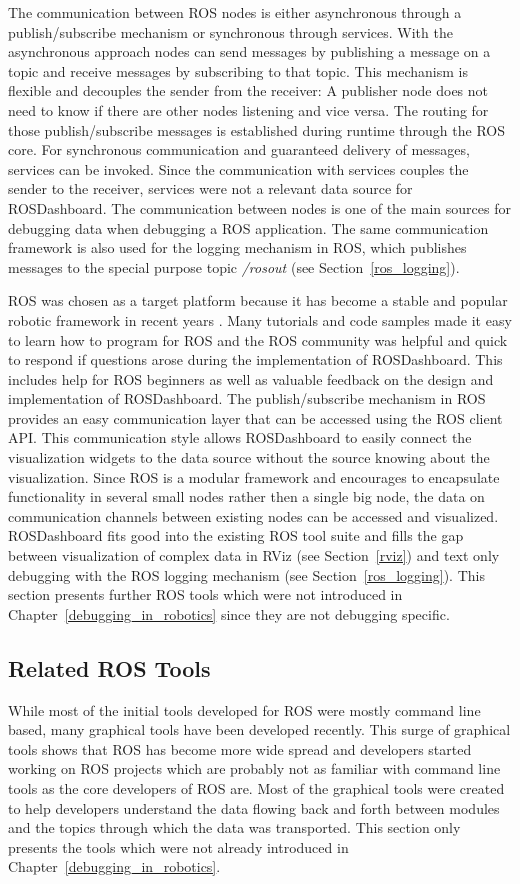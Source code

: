 The communication between ROS nodes is either asynchronous through a publish/subscribe mechanism or synchronous through services. With the asynchronous approach nodes can send messages by publishing a message on a topic and receive messages by subscribing to that topic. This mechanism is flexible and decouples the sender from the receiver: A publisher node does not need to know if there are other nodes listening and vice versa. The routing for those publish/subscribe messages is established during runtime through the ROS core. For synchronous communication and guaranteed delivery of messages, services can be invoked. Since the communication with services couples the sender to the receiver, services were not a relevant data source for ROSDashboard. The communication between nodes is one of the main sources for debugging data when debugging a ROS application. The same communication framework is also used for the logging mechanism in ROS, which publishes messages to the special purpose topic \emph{/rosout} (see Section~\ref{ros_logging}).

ROS was chosen as a target platform because it has become a stable and popular robotic framework in recent years \cite{Foote2012}. Many tutorials and code samples made it easy to learn how to program for ROS and the ROS community was helpful and quick to respond if questions arose during the implementation of ROSDashboard. This includes help for ROS beginners as well as valuable feedback on the design and implementation of ROSDashboard. The publish/subscribe mechanism in ROS provides an easy communication layer that can be accessed using the ROS client API. This communication style allows ROSDashboard to easily connect the visualization widgets to the data source without the source knowing about the visualization. Since ROS is a modular framework and encourages to encapsulate functionality in several small nodes rather then a single big node, the data on communication channels between existing nodes can be accessed and visualized. ROSDashboard fits good into the existing ROS tool suite and fills the gap between visualization of complex data in RViz (see Section~\ref{rviz}) and text only debugging with the ROS logging mechanism (see Section~\ref{ros_logging}). This section presents further ROS tools which were not introduced in Chapter~\ref{debugging_in_robotics} since they are not debugging specific.

\subsection{Related ROS Tools}
While most of the initial tools developed for ROS were mostly command line based, many graphical tools have been developed recently. This surge of graphical tools shows that ROS has become more wide spread and developers started working on ROS projects which are probably not as familiar with command line tools as the core developers of ROS are. Most of the graphical tools were created to help developers understand the data flowing back and forth between modules and the topics through which the data was transported. This section only presents the tools which were not already introduced in Chapter~\ref{debugging_in_robotics}.

